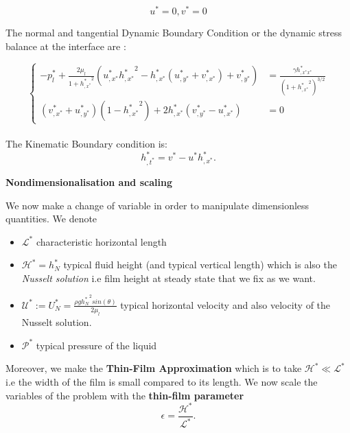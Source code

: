 \documentclass[12pt]{article}
\begin{document}
\begin{equation}
    u^*=0, v^*=0
\end{equation} 

The normal and tangential Dynamic Boundary Condition or the dynamic stress balance at the interface are : 

\begin{equation}
\left\{
\begin{aligned}
-p^*_l + \frac{2\mu_l}{1+{h^*_{,x^*}}^2}(u^*_{,x^*}{h^*_{,x^*}}^2 - h^*_{,x^*}(u^*_{,y^*} + v^*_{,x^*})+v^*_{,y^*}) &= \frac{\gamma h^*_{,x^*x^*}}{(1+{h^*_{,x^*}}^2)^{3/2}}\\
(v^*_{,x^*} + u^*_{,y^*})(1-{h^*_{,x^*}}^2)+2h^*_{,x^*}(v^*_{,y^*}-u^*_{,x^*})&=0
\end{aligned}
\right.
\end{equation}
\\

The Kinematic Boundary condition is: 
\begin{equation}
h^*_{,t^*} = v^*-u^*h^*_{,x^*}.
\end{equation}


\vspace{0.5cm}
\textbf{Nondimensionalisation and scaling}


We now make a change of variable in order to manipulate dimensionless quantities. We denote 
\begin{itemize}
    \item $\mathcal{L^*}$ characteristic horizontal length
    \item $\mathcal{H^*}= h_N^* $ typical fluid height (and typical vertical length) which is also the \textit{Nusselt solution} i.e film height at steady state that we fix as we want.
    \item $\mathcal{U^*} := U^*_N=\frac{\rho g{h_N^*}^2 sin(\theta)}{2\mu_l}$ typical horizontal velocity and also velocity of the Nusselt solution. 
    \item $\mathcal{P^*}$ typical pressure of the liquid \\
\end{itemize}


Moreover, we make the \textbf{Thin-Film Approximation} which is to take $\mathcal{H^*} \ll \mathcal{L^*}$ i.e the width of the film is small compared to its length. We now scale the variables of the problem with the \textbf{thin-film parameter} 
\begin{equation}
\boxed{
\epsilon = \frac{\mathcal{H^*}}{\mathcal{L^*}}.
}
\end{equation}
\end{document}
